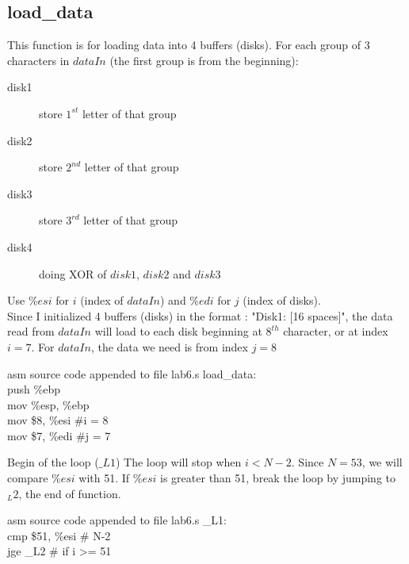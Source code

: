 \documentclass{article}
\begin{document}
\subsection{load\_data}
This function is for loading data into 4 buffers (disks). For each group of 3 characters in $dataIn$ (the first group is from the beginning):
\begin{description}
\item[disk1] store $1^{st}$ letter of that group
\item[disk2] store $2^{nd}$ letter of that group
\item[disk3] store $3^{rd}$ letter of that group
\item[disk4] doing XOR of $disk1$, $disk2$ and $disk3$
\end{description}
Use $\%esi$ for $i$ (index of $dataIn$) and $\%edi$ for $j$ (index of disks). \\
Since I initialized 4 buffers (disks) in the format : "Disk1: [16 spaces]", the data read from $dataIn$ will load to each disk beginning at $8^{th}$ character, or at index $i=7$. For $dataIn$, the data we need is from index $j=8$
\begin{GFT}{asm source code appended to file lab6.s}
\+load\_data:\\
\+push \%ebp\\
\+mov \%esp, \%ebp\\
\+mov \$8, \%esi		\#i = 8\\
\+mov \$7, \%edi		\#j = 7\\
\end{GFT}
Begin of the loop ($\_L1$) The loop will stop when \( i < N - 2\). Since $N=53$, we will compare $\%esi$ with 51. If $\%esi$ is greater than 51, break the loop by jumping to $_L2$, the end of function.
\begin{GFT}{asm source code appended to file lab6.s}
\+\_L1:\\
\+cmp \$51, \%esi		\# N-2\\
\+jge \_L2			\# if i >= 51\\
\end{GFT}
\end{document}
